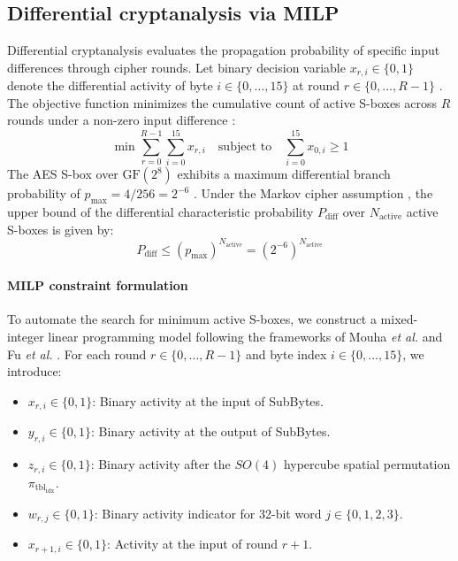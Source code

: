 \documentclass[10pt,twocolumn]{article}
\begin{document}
\subsection{Differential cryptanalysis via MILP}
Differential cryptanalysis evaluates the propagation probability of specific input differences through cipher rounds. Let binary decision variable $x_{r, i} \in \{0, 1\}$ denote the differential activity of byte $i \in \{0, \dots, 15\}$ at round $r \in \{0, \dots, R-1\}$ \cite{mouha2011differential}. The objective function minimizes the cumulative count of active S-boxes across $R$ rounds under a non-zero input difference \cite{mouha2011differential, fu2016milp}:
\begin{equation}
    \min \sum_{r=0}^{R-1} \sum_{i=0}^{15} x_{r, i} \quad \text{subject to} \quad \sum_{i=0}^{15} x_{0, i} \ge 1
\end{equation}
The AES S-box over $\text{GF}(2^8)$ exhibits a maximum differential branch probability of $p_{\max} = 4/256 = 2^{-6}$ \cite{daemen2002design}. Under the Markov cipher assumption \cite{lai1991markov}, the upper bound of the differential characteristic probability $P_{\text{diff}}$ over $N_{\text{active}}$ active S-boxes is given by:
\begin{equation}
    P_{\text{diff}} \le (p_{\max})^{N_{\text{active}}} = \left(2^{-6}\right)^{N_{\text{active}}}
\end{equation}

\paragraph{MILP constraint formulation}
To automate the search for minimum active S-boxes, we construct a mixed-integer linear programming model following the frameworks of Mouha \textit{et al.} \cite{mouha2011differential} and Fu \textit{et al.} \cite{fu2016milp}. For each round $r \in \{0, \dots, R-1\}$ and byte index $i \in \{0, \dots, 15\}$, we introduce:
\begin{itemize}
    \item $x_{r, i} \in \{0, 1\}$: Binary activity at the input of SubBytes.
    \item $y_{r, i} \in \{0, 1\}$: Binary activity at the output of SubBytes.
    \item $z_{r, i} \in \{0, 1\}$: Binary activity after the $SO(4)$ hypercube spatial permutation $\pi_{\text{tbl}_{\text{idx}}}$.
    \item $w_{r, j} \in \{0, 1\}$: Binary activity indicator for 32-bit word $j \in \{0, 1, 2, 3\}$.
    \item $x_{r+1, i} \in \{0, 1\}$: Activity at the input of round $r+1$.
\end{itemize}
\end{document}
